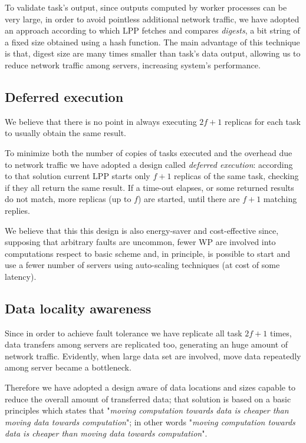 \documentclass[sigchi]{acmart}
\begin{document}
To validate task's output, since outputs computed by worker processes can be very large, in order to avoid pointless additional network traffic, we have adopted an approach according to which LPP fetches and compares \textit{digests}, a bit string of a fixed size obtained using a hash function. The main advantage of this technique is that, digest size are many times smaller than task's data output, allowing us to reduce network traffic among servers, increasing system's performance.

\subsection{Deferred execution} We believe that there is no point in always executing $2f + 1$ replicas for each task to usually obtain the same result. 

To minimize both the number of copies of tasks executed and the overhead due to network traffic we have adopted a design called \textit{deferred execution}: according to that solution current LPP starts only $f + 1$ replicas of the same task, checking if they all return the same result. If a time-out elapses, or some returned results do not match, more replicas (up to $f$) are started, until there are $f + 1$ matching replies. 

We believe that this this design is also energy-saver and cost-effective since, supposing that arbitrary faults are uncommon, fewer WP are involved into computations respect to basic scheme and, in principle, is possible to start and use a fewer number of servers using auto-scaling techniques (at cost of some latency).

\subsection{Data locality awareness}

Since in order to achieve fault tolerance we have replicate all task $2f + 1$ times, data transfers among servers are replicated too, generating an huge amount of network traffic. Evidently, when large data set are involved, move data repeatedly among server became a bottleneck.

Therefore we have adopted a design aware of data locations and sizes capable to reduce the overall amount of transferred data; that solution is based on a basic principles which states that "\textit{moving computation towards data is cheaper than moving data towards computation}"; in other words  "\textit{moving computation towards data is cheaper than moving data towards computation}".
\end{document}
